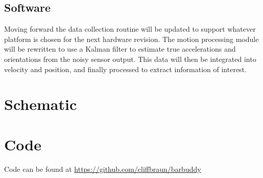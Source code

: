 \documentclass[11pt,oneside]{amsart}
\begin{document}
\subsection{Software}
Moving forward the data collection routine will be updated to support whatever platform is chosen for the next hardware revision. The motion processing module will be rewritten to use a Kalman filter to estimate true accelerations and orientations from the noisy sensor output. This data will then be integrated into velocity and position, and finally processed to extract information of interest. 
\newpage
\begin{appendix}
\section{Schematic}
\label{sec:schematic}

\section{Code}
Code can be found at \url{https://github.com/cliffbraun/barbuddy}


\end{appendix}
\end{document}
